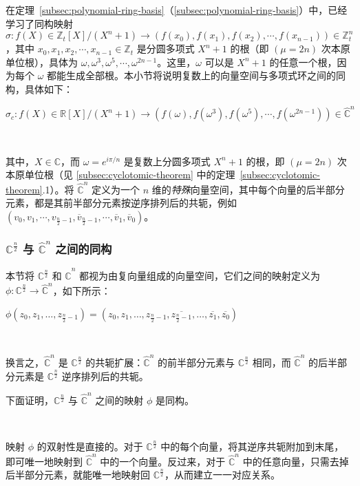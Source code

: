 在定理~\ref*{subsec:polynomial-ring-basis}（\autoref{subsec:polynomial-ring-basis}）中，已经学习了同构映射
\[
\sigma: f(X) \in \mathbb{Z}_t[X]/(X^n + 1) \longrightarrow (f(x_0),f(x_1),f(x_2), \cdots, f(x_{n-1})) \in \mathbb{Z}_t^n
\]
，其中 $x_0, x_1, x_2, \cdots, x_{n-1} \in \mathbb{Z}_t$ 是分圆多项式 $X^n + 1$ 的根（即 $(\mu=2n)$ 次本原单位根），具体为 $\omega, \omega^3, \omega^5, \cdots, \omega^{2n-1}$。这里，$\omega$ 可以是 $X^n + 1$ 的任意一个根，因为每个 $\omega$ 都能生成全部根。本小节将说明复数上的向量空间与多项式环之间的同构，具体如下：

$\sigma_c: f(X) \in \mathbb{R}[X]/(X^n + 1) \longrightarrow (f(\omega),f(\omega^3),f(\omega^5), \cdots, f(\omega^{2n-1})) \in \mathbb{\hat{C}}^{n}$

$ $

其中，$X \in \mathbb{C}$，而 $\omega = e^{i\pi/n}$ 是复数上分圆多项式 $X^n + 1$ 的根，即 $(\mu=2n)$ 次本原单位根（见 \autoref{subsec:cyclotomic-theorem} 中的定理~\ref*{subsec:cyclotomic-theorem}.1）。将 $\mathbb{\hat{C}}^{n}$ 定义为一个 $n$ 维的\textit{特殊}向量空间，其中每个向量的后半部分元素，都是其前半部分元素按逆序排列后的共轭，例如 $(v_0, v_1, \cdots, v_{\frac{n}{2}-1}, \overline{v}_{\frac{n}{2}-1}, \cdots, \overline{v}_1, \overline{v}_0 )$。

\subsubsection{$\mathbb{C}^{\frac{n}{2}}$ 与 $\hat{\mathbb{C}}^{n}$ 之间的同构}
\label{subsec:poly-vector-transformation-complex-isomorphism1}

本节将 $\mathbb{C}^{\frac{n}{2}}$ 和 $\hat{\mathbb{C}}^{n}$ 都视为由复向量组成的向量空间，它们之间的映射定义为 $\phi: \mathbb{C}^{\frac{n}{2}} \rightarrow \hat{\mathbb{C}}^{n}$，如下所示：

$\phi(z_0, z_1, \dots, z_{\frac{n}{2}-1}) = (z_0, z_1, \dots, z_{\frac{n}{2}-1}, \overline{z_{\frac{n}{2}-1}}, \dots, \overline{z_1}, \overline{z_0})$


$ $

换言之，$\hat{\mathbb{C}}^{n}$ 是 $\mathbb{C}^{\frac{n}{2}}$ 的共轭扩展：$\hat{\mathbb{C}}^{n}$ 的前半部分元素与 $\mathbb{C}^{\frac{n}{2}}$ 相同，而 $\hat{\mathbb{C}}^{n}$ 的后半部分元素是 $\mathbb{C}^{\frac{n}{2}}$ 逆序排列后的共轭。

下面证明，$\mathbb{C}^{\frac{n}{2}}$ 与 $\hat{\mathbb{C}}^{n}$ 之间的映射 $\phi$ 是同构。


$ $

映射 $\phi$ 的双射性是直接的。对于 $\mathbb{C}^{\frac{n}{2}}$ 中的每个向量，将其逆序共轭附加到末尾，即可唯一地映射到 $\hat{\mathbb{C}}^{n}$ 中的一个向量。反过来，对于 $\hat{\mathbb{C}}^{n}$ 中的任意向量，只需去掉后半部分元素，就能唯一地映射回 $\mathbb{C}^{\frac{n}{2}}$，从而建立一一对应关系。

